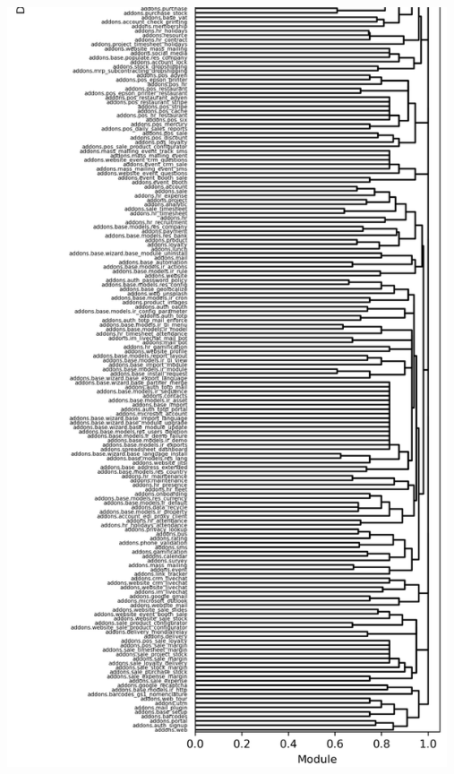 \begin{center}
  \includegraphics[width=13cm]{img/lampiran/complete-full-2.png}
  \label{fig:complete-full-2}
\end{center}
\pagebreak

